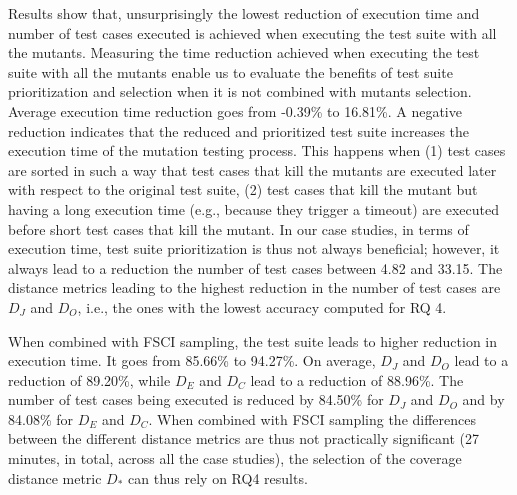 Results show that, unsurprisingly the lowest reduction of execution time and number of test cases executed is achieved when executing the \APPR test suite with all the mutants. 
Measuring the time reduction achieved when executing the \APPR test suite with all the mutants enable us to evaluate the benefits of test suite prioritization and selection when it is not combined with mutants selection.
Average execution time reduction goes from  -0.39\% 
to 16.81\%. A negative reduction indicates that the reduced and prioritized test suite increases the execution time of the mutation testing process. This happens when (1) test cases are sorted in such a way that test cases that kill the mutants are executed later with respect to the original test suite, (2) test cases that kill the mutant but having a long execution time (e.g., because they trigger a timeout) are executed before short test cases that kill the mutant. In our case studies, in terms of execution time, test suite prioritization is thus not always beneficial; however, it always lead to a reduction the number of test cases between 4.82 and 33.15. The distance metrics leading to the highest reduction in the number of test cases are $D_J$ and $D_O$, i.e., the ones with the lowest accuracy computed for RQ 4.

When combined with FSCI sampling, the \APPR test suite leads to higher reduction in execution time. It goes from 85.66\% to 94.27\%. On average, $D_J$ and $D_O$ lead to a reduction of 89.20\%, while $D_E$ and $D_C$ lead to a reduction of 88.96\%. The number of test cases being executed is reduced by 84.50\% for $D_J$ and $D_O$ and by 84.08\% for $D_E$ and $D_C$. When combined with FSCI sampling the differences between the different distance metrics are thus not practically significant (27 minutes, in total, across all the case studies), the selection of the coverage distance metric $D_*$ can thus rely on RQ4 results.

